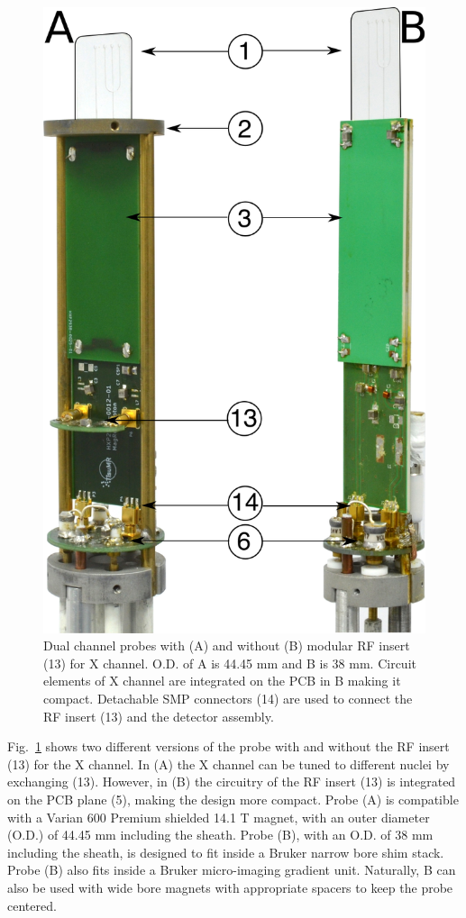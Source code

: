 \documentclass[preprint,5p]{elsarticle}
\newcommand{\fig}[1]{Fig.~\ref{#1}}
\begin{document}
\begin{figure}
\centering
\includegraphics[width=.5\linewidth,keepaspectratio=true]{./figures/ms5n17-tlp-im-181007-both-detectors.png}
\caption{Dual channel probes with (A) and without (B) modular RF insert (13) for X channel.
O.D. of A is 44.45 mm and B is 38 mm. Circuit elements of X channel are integrated on the
PCB in B making it compact. Detachable SMP connectors (14) are used to
connect the RF insert (13) and the detector assembly.}
\label{fig:ProbePhoto}
\end{figure}
\fig{fig:ProbePhoto} shows two different versions of the probe with and without the RF insert (13)
for the X channel. In (A) the X channel can be tuned to different nuclei by exchanging (13).
However, in (B) the circuitry of the RF insert (13) is integrated on the PCB plane (5),
making the design more compact.
 Probe (A) is compatible with a Varian 600 Premium shielded 14.1 T magnet, with an outer diameter (O.D.) of 44.45 mm including the sheath. Probe (B), with an
O.D. of 38 mm including the sheath, is designed to fit inside a
Bruker narrow bore shim stack.
Probe (B) also fits inside a Bruker micro-imaging gradient unit. Naturally, B can also be used with
wide bore magnets with appropriate spacers to keep the probe centered.
\end{document}
